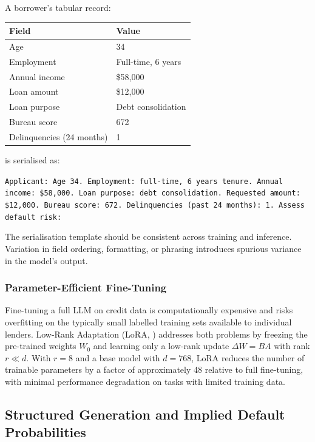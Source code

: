 \begin{context}
\begin{example}
\label{ex:serialisation}
A borrower's tabular record:
\begin{center}
\begin{tabular}{ll}
\toprule
Field & Value \\
\midrule
Age & 34 \\
Employment & Full-time, 6 years \\
Annual income & \$58,000 \\
Loan amount & \$12,000 \\
Loan purpose & Debt consolidation \\
Bureau score & 672 \\
Delinquencies (24 months) & 1 \\
\bottomrule
\end{tabular}
\end{center}
is serialised as:

\smallskip
\texttt{Applicant: Age 34. Employment: full-time, 6 years tenure. Annual income: \$58,000. Loan purpose: debt consolidation. Requested amount: \$12,000. Bureau score: 672. Delinquencies (past 24 months): 1. Assess default risk:}
\end{example}

The serialisation template should be consistent across training and inference. Variation in field ordering, formatting, or phrasing introduces spurious variance in the model's output.

\subsubsection*{Parameter-Efficient Fine-Tuning}

Fine-tuning a full LLM on credit data is computationally expensive and risks overfitting on the typically small labelled training sets available to individual lenders. Low-Rank Adaptation (LoRA, ) addresses both problems by freezing the pre-trained weights $W_0$ and learning only a low-rank update $\Delta W = BA$ with rank $r \ll d$. With $r = 8$ and a base model with $d = 768$, LoRA reduces the number of trainable parameters by a factor of approximately 48 relative to full fine-tuning, with minimal performance degradation on tasks with limited training data.

\subsection{Structured Generation and Implied Default Probabilities}
\label{subsec:structured-gen}


\end{context}
